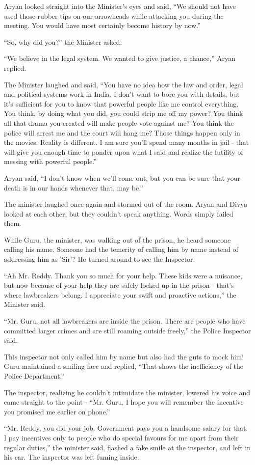 Aryan looked straight into the Minister's eyes and said, “We should not have
used those rubber tips on our arrowheads while attacking you during the meeting.
You would have most certainly become history by now.”

“So, why did you?” the Minister asked.

“We believe in the legal system. We wanted to give justice, a chance,” Aryan
replied.

The Minister laughed and said, “You have no idea how the law and order, legal
and political systems work in India. I don't want to bore you with details, but
it's sufficient for you to know that powerful people like me control everything.
You think, by doing what you did, you could strip me off my power? You think all
that drama you created will make people vote against me? You think the police
will arrest me and the court will hang me? Those things happen only in the
movies. Reality is different. I am sure you'll spend many months in jail - that
will give you enough time to ponder upon what I said and realize the futility of
messing with powerful people.”

Aryan said, “I don't know when we'll come out, but you can be sure that your
death is in our hands whenever that, may be.”

The minister laughed once again and stormed out of the room. Aryan and Divya
looked at each other, but they couldn't speak anything. Words simply failed them.

While Guru, the minister, was walking out of the prison, he heard someone
calling his name. Someone had the temerity of calling him by name instead of
addressing him as 'Sir'? He turned around to see the Inspector.

“Ah Mr. Reddy. Thank you so much for your help. These kids were a nuisance, but
now because of your help they are safely locked up in the prison - that's where
lawbreakers belong. I appreciate your swift and proactive actions,” the
Minister said.

“Mr. Guru, not all lawbreakers are inside the prison. There are people who have
committed larger crimes and are still roaming outside freely,” the Police
Inspector said.

This inspector not only called him by name but also had the guts to mock him!
Guru maintained a smiling face and replied, “That shows the inefficiency of the
Police Department.”

The inspector, realizing he couldn't intimidate the minister, lowered his voice
and came straight to the point - “Mr. Guru, I hope you will remember the
incentive you promised me earlier on phone.”

“Mr. Reddy, you did your job. Government pays you a handsome salary for that. I
pay incentives only to people who do special favours for me apart from their
regular duties,” the minister said, flashed a fake smile at the inspector, and
left in his car. The inspector was left fuming inside.